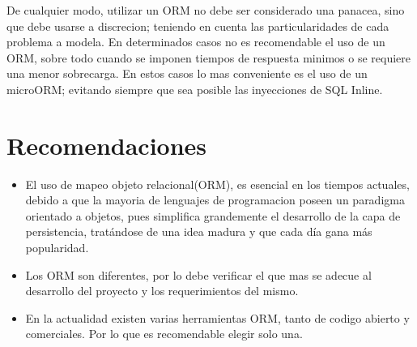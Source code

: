\documentclass[twoside,twocolumn]{article}
\begin{document}
De cualquier modo, utilizar un ORM no debe ser considerado una panacea, sino que debe usarse a discrecion; teniendo en cuenta las 
particularidades de cada problema a modela. En determinados casos no es recomendable el uso de un ORM,
sobre todo cuando se imponen tiempos de respuesta minimos o se requiere una menor sobrecarga. En estos casos lo mas conveniente es el uso de un 
microORM; evitando siempre que sea posible las inyecciones de SQL Inline.
\section{Recomendaciones}
 \begin{itemize}
\item El uso de mapeo objeto relacional(ORM), es esencial en los tiempos actuales, debido a que la mayoria de lenguajes de programacion poseen un paradigma orientado a objetos, pues simplifica grandemente el
desarrollo de la capa de persistencia, tratándose de una idea madura y
que cada día gana más popularidad. 

\item Los ORM son diferentes, por lo debe verificar el que mas se adecue al desarrollo del proyecto y los requerimientos del mismo.

\item En la actualidad existen varias herramientas ORM, tanto de codigo abierto y comerciales. Por lo que es recomendable elegir solo una.
 \end{itemize}
\end{document}
